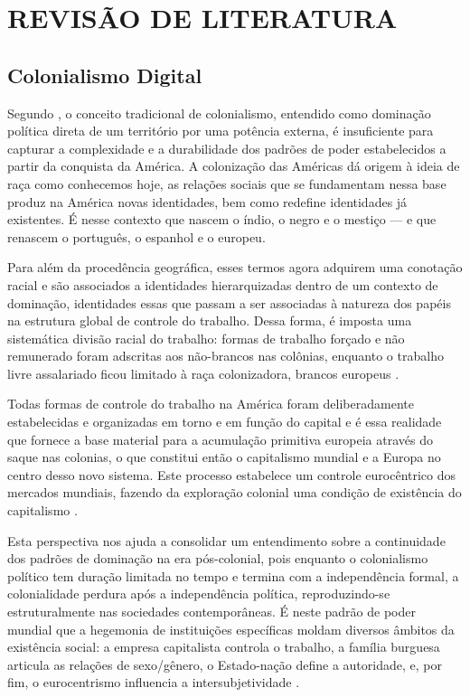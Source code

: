 
\chapter{REVISÃO DE LITERATURA}
\label{chap:revisaodeliteratura}

\section{Colonialismo Digital}
\label{sec:colDados}

Segundo , o conceito tradicional de colonialismo, entendido como dominação política direta de um território por uma potência externa, é insuficiente para capturar a complexidade e a durabilidade dos padrões de poder estabelecidos a partir da conquista da América. A  colonização das Américas dá origem à ideia de raça como conhecemos hoje, as relações sociais que se fundamentam nessa base produz na América novas identidades, bem como redefine identidades já existentes. É nesse contexto que nascem o índio, o negro e o mestiço — e que renascem o  português, o espanhol e o europeu. 

Para além da procedência geográfica, esses termos agora adquirem uma conotação racial e são associados a identidades hierarquizadas dentro de um contexto de dominação, identidades essas que passam a ser associadas à natureza dos papéis na estrutura global de controle do trabalho. Dessa forma, é imposta uma sistemática divisão racial do trabalho: formas de trabalho forçado e não remunerado foram adscritas aos não-brancos nas colônias, enquanto o trabalho livre assalariado ficou limitado à raça colonizadora, brancos europeus \cite{quijano2005}. 

Todas formas de controle do trabalho na América foram deliberadamente estabelecidas e organizadas em torno e em função do capital e é essa realidade que fornece a base material para a acumulação primitiva europeia através do saque nas colonias, o que constitui então o capitalismo mundial e a Europa no centro desso novo sistema. Este processo estabelece um controle eurocêntrico dos mercados mundiais, fazendo da exploração colonial uma condição de existência do capitalismo \cite{quijano2005}.

Esta perspectiva nos ajuda a consolidar um entendimento sobre a continuidade dos padrões de dominação na era pós-colonial, pois enquanto o colonialismo político tem duração limitada no tempo e termina com a independência formal, a colonialidade perdura após a independência política, reproduzindo-se estruturalmente nas sociedades contemporâneas. É neste padrão de poder mundial que a hegemonia de instituições específicas moldam diversos âmbitos da existência social: a empresa capitalista controla o trabalho, a família burguesa articula as relações de sexo/gênero, o Estado-nação define a autoridade, e, por fim, o eurocentrismo influencia a intersubjetividade
 \cite{quijano2005}.

